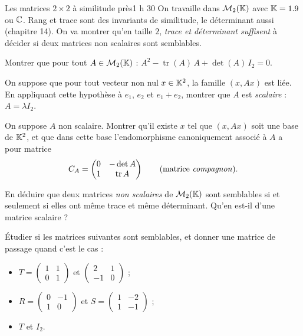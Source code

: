 

\begin{defi}{Les matrices $2\times2$ à similitude près}{1 h 30}
On travaille dans $\mathcal{M}_2(\mathbb{K})$ avec $\mathbb{K}=1.9$ ou $\mathbb{C}$. Rang et
trace sont des invariants de similitude, le déterminant aussi
(chapitre 14). On va montrer qu'en taille $2$, \emph{trace et déterminant
suffisent} à décider si deux matrices non scalaires sont semblables.

\begin{questions}
  \item Montrer que pour tout $A\in\mathcal{M}_2(\mathbb{K})$ :
    $A^{2}-\operatorname{tr}(A)\,A+\det(A)\,I_2=0$.
  \item On suppose que pour tout vecteur non nul $x\in\mathbb{K}^{2}$, la famille
    $(x,Ax)$ est liée. En appliquant cette hypothèse à $e_1$, $e_2$ et
    $e_1+e_2$, montrer que $A$ est \emph{scalaire} : $A=\lambda I_2$.
  \item On suppose $A$ non scalaire. Montrer qu'il existe $x$ tel que
    $(x,Ax)$ soit une base de $\mathbb{K}^{2}$, et que dans cette base
    l'endomorphisme canoniquement associé à $A$ a pour matrice
    \[
    C_A=\begin{pmatrix}0&-\det A\\ 1&\operatorname{tr}A\end{pmatrix}
    \qquad(\text{matrice \emph{compagnon}}).
    \]
\end{questions}

\begin{questions}[resume]
  \item En déduire que deux matrices \emph{non scalaires} de
    $\mathcal{M}_2(\mathbb{K})$ sont semblables si et seulement si elles ont même
    trace et même déterminant. Qu'en est-il d'une matrice scalaire ?
  \item Étudier si les matrices suivantes sont semblables, et donner une
    matrice de passage quand c'est le cas :
    \begin{itemize}[label={\color{otNavy}\textbullet},leftmargin=1.2em,itemsep=0.5mm,topsep=0.6mm]
      \item $T=\begin{pmatrix}1&1\\0&1\end{pmatrix}$ et
        $\begin{pmatrix}2&1\\-1&0\end{pmatrix}$ ;
      \item $R=\begin{pmatrix}0&-1\\1&0\end{pmatrix}$ et
        $S=\begin{pmatrix}1&-2\\1&-1\end{pmatrix}$ ;
      \item $T$ et $I_2$.
    \end{itemize}
\end{questions}


\end{defi}
